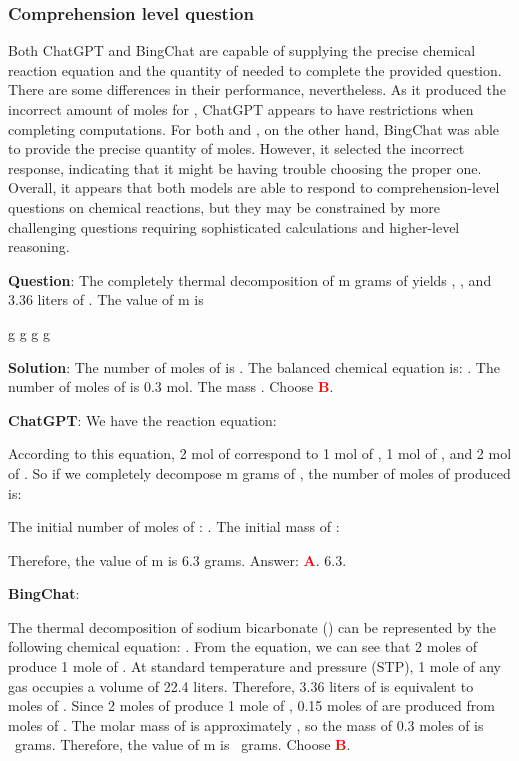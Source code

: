\documentclass{article}
\begin{document}
{\begin{mdframed}[linewidth=1pt,linecolor=red]
	\end{mdframed}	
	
	\subsubsection{Comprehension level question}
	\label{VNHSGE_Che_C}
	
	Both ChatGPT and BingChat are capable of supplying the precise chemical reaction equation and the quantity of  needed to complete the provided question. There are some differences in their performance, nevertheless. As it produced the incorrect amount of moles for , ChatGPT appears to have restrictions when completing computations. For both  and , on the other hand, BingChat was able to provide the precise quantity of moles. However, it selected the incorrect response, indicating that it might be having trouble choosing the proper one. Overall, it appears that both models are able to respond to comprehension-level questions on chemical reactions, but they may be constrained by more challenging questions requiring sophisticated calculations and higher-level reasoning.
	
	
	
	\begin{mdframed}[linewidth=1pt,linecolor=red] \textbf{Question}: The completely thermal decomposition of m grams of  yields , , and 3.36 liters of . The value of m is
		
		\begin{oneparchoices}
			 g
			 g
			 g
			 g
		\end{oneparchoices}
		
		\textbf{Solution}: The number of moles of  is . The balanced chemical equation is: .	The number of moles of  is 0.3 mol. The mass . Choose \textcolor{red}{\textbf{B}}.
		
		\textbf{ChatGPT}: We have the reaction equation:
		
		According to this equation, 2 mol of  correspond to 1 mol of , 1 mol of , and 2 mol of . So if we completely decompose m grams of , the number of moles of  produced is:
		
		The initial number of moles of : . The initial mass of :
		
		Therefore, the value of m is 6.3 grams.
		Answer: \textcolor{red}{\textbf{A}}. 6.3.
		
		\textbf{BingChat}: 
		
		The thermal decomposition of sodium bicarbonate () can be represented by the following chemical equation:  . From the equation, we can see that 2 moles of  produce 1 mole of . At standard temperature and pressure (STP), 1 mole of any gas occupies a volume of 22.4 liters. Therefore, 3.36 liters of  is equivalent to  moles of . Since 2 moles of  produce 1 mole of , 0.15 moles of  are produced from  moles of . The molar mass of  is approximately , so the mass of 0.3 moles of  is ~grams. Therefore, the value of m is ~grams. Choose \textcolor{red}{\textbf{B}}. 
		

\end{mdframed}}
\end{document}
